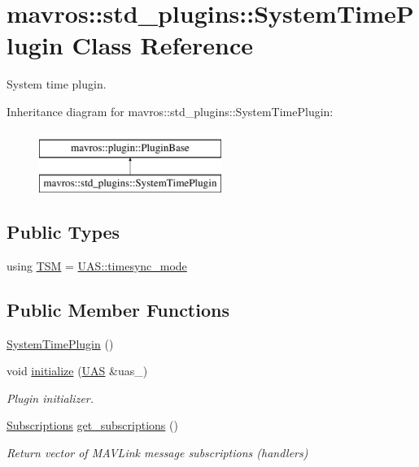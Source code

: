 \hypertarget{classmavros_1_1std__plugins_1_1SystemTimePlugin}{}\section{mavros\+::std\+\_\+plugins\+::System\+Time\+Plugin Class Reference}
\label{classmavros_1_1std__plugins_1_1SystemTimePlugin}


System time plugin.  


Inheritance diagram for mavros\+::std\+\_\+plugins\+::System\+Time\+Plugin\+:\begin{figure}[H]
\begin{center}
\leavevmode
\includegraphics[height=2.000000cm]{classmavros_1_1std__plugins_1_1SystemTimePlugin}
\end{center}
\end{figure}
\subsection*{Public Types}
\begin{DoxyCompactItemize}
\item 
using \mbox{\hyperlink{group__plugin_ga57fc98429d89947298f623d8fbb37364}{T\+SM}} = \mbox{\hyperlink{group__mavutils_gac7f53712a7627f397d0eb145c2a16cf7}{U\+A\+S\+::timesync\+\_\+mode}}
\end{DoxyCompactItemize}
\subsection*{Public Member Functions}
\begin{DoxyCompactItemize}
\item 
\mbox{\hyperlink{group__plugin_ga34c7a6c4d0439bf12c630ffcbeef66c9}{System\+Time\+Plugin}} ()
\item 
void \mbox{\hyperlink{group__plugin_ga37f8fa27ccd8cf66cb81479cba446150}{initialize}} (\mbox{\hyperlink{classmavros_1_1UAS}{U\+AS}} \&uas\+\_\+)
\begin{DoxyCompactList}\small\item\em Plugin initializer. \end{DoxyCompactList}\item 
\mbox{\hyperlink{group__plugin_ga8967d61fc77040e0c3ea5a4585d62a09}{Subscriptions}} \mbox{\hyperlink{group__plugin_gab01303b0702a925da36b38cb1d1a1d45}{get\+\_\+subscriptions}} ()
\begin{DoxyCompactList}\small\item\em Return vector of M\+A\+V\+Link message subscriptions (handlers) \end{DoxyCompactList}\end{DoxyCompactItemize}
